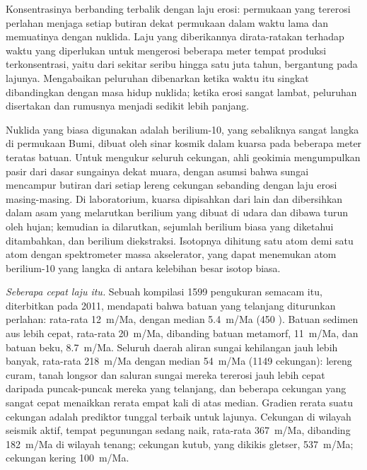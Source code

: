 Konsentrasinya berbanding terbalik dengan laju erosi: permukaan yang tererosi perlahan menjaga setiap butiran dekat permukaan dalam waktu lama dan memuatinya dengan nuklida. Laju yang diberikannya dirata-ratakan terhadap waktu yang diperlukan untuk mengerosi beberapa meter tempat produksi terkonsentrasi, yaitu dari sekitar seribu hingga satu juta tahun, bergantung pada lajunya. Mengabaikan peluruhan dibenarkan ketika waktu itu singkat dibandingkan dengan masa hidup nuklida; ketika erosi sangat lambat, peluruhan disertakan dan rumusnya menjadi sedikit lebih panjang.

\begin{inthelab}
Nuklida yang biasa digunakan adalah berilium-10, yang sebaliknya sangat langka di permukaan Bumi, dibuat oleh sinar kosmik dalam kuarsa pada beberapa meter teratas batuan. Untuk mengukur
 seluruh cekungan, ahli geokimia mengumpulkan pasir dari dasar sungainya dekat muara, dengan asumsi bahwa sungai mencampur butiran dari setiap lereng cekungan sebanding dengan laju erosi masing-masing. Di laboratorium, kuarsa dipisahkan dari  lain dan dibersihkan dalam
asam yang melarutkan berilium yang dibuat di udara dan dibawa turun oleh hujan; kemudian ia dilarutkan, sejumlah berilium biasa yang diketahui ditambahkan, dan berilium diekstraksi. Isotopnya dihitung satu atom demi satu atom dengan spektrometer massa akselerator, yang dapat menemukan atom berilium-10 yang langka di antara kelebihan besar isotop biasa.
\end{inthelab}

\emph{Seberapa cepat laju itu.} Sebuah kompilasi \num{1599} pengukuran semacam itu, diterbitkan pada 2011, mendapati bahwa  batuan yang telanjang diturunkan perlahan: rata-rata \qty{12}{m/Ma}, dengan median \qty{5.4}{m/Ma} (450 ). Batuan sedimen aus lebih cepat, rata-rata \qty{20}{m/Ma}, dibanding batuan metamorf, \qty{11}{m/Ma}, dan batuan beku, \qty{8.7}{m/Ma}. Seluruh daerah aliran sungai kehilangan jauh lebih banyak, rata-rata \qty{218}{m/Ma} dengan median \qty{54}{m/Ma} (\num{1149} cekungan): lereng curam, tanah longsor dan saluran sungai mereka tererosi jauh lebih cepat daripada puncak-puncak mereka yang telanjang, dan beberapa cekungan yang sangat cepat menaikkan rerata empat kali di atas median. Gradien rerata suatu cekungan adalah prediktor tunggal terbaik untuk lajunya. Cekungan di wilayah seismik aktif, tempat pegunungan sedang naik, rata-rata \qty{367}{m/Ma}, dibanding \qty{182}{m/Ma} di wilayah tenang; cekungan kutub, yang dikikis gletser, \qty{537}{m/Ma}; cekungan kering \qty{100}{m/Ma}.

